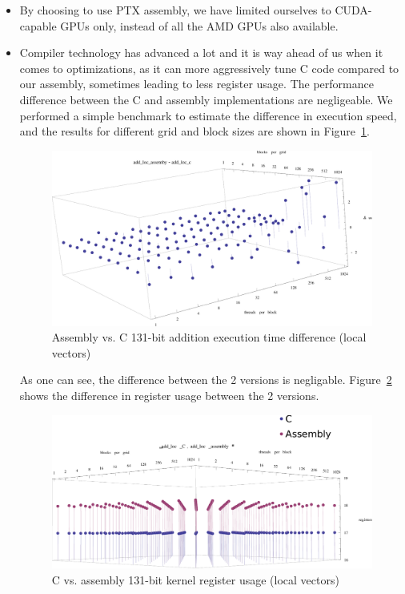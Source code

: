 \documentclass[12pt, a4paper]{report}
\begin{document}
\begin{sloppypar}
\begin{itemize}
\item By choosing to use PTX assembly, we have limited ourselves to CUDA-capable
GPUs only, instead of all the AMD GPUs also available.
\item Compiler technology has advanced a lot and it is way ahead of us when it
comes to optimizations, as it can more aggressively tune C code compared to
our assembly, sometimes leading to less register usage.
The performance difference between the C and assembly implementations are
negligeable.
We performed a simple benchmark to estimate the difference in execution speed,
and the results for different grid and block sizes are shown in
Figure~\ref{fig:assembly_vs_c_loc_kepler_131_duration_difference}.

\begin{figure}[h]
\centering
\includegraphics[scale=0.4]{figs/assembly_vs_c_loc_kepler_131_duration_difference}
\caption{Assembly vs. C 131-bit addition execution time difference (local vectors)}
\label{fig:assembly_vs_c_loc_kepler_131_duration_difference}
\end{figure}

As one can see, the difference between the 2 versions is negligable.
Figure~\ref{fig:assembly_vs_c_loc_kepler_131_registers} shows the difference in
register usage between the 2 versions.

\begin{figure}[h]
\centering
\includegraphics[scale=0.4]{figs/assembly_vs_c_loc_kepler_131_registers}
\caption{C vs. assembly 131-bit kernel register usage (local vectors)}
\label{fig:assembly_vs_c_loc_kepler_131_registers}
\end{figure}


\end{itemize}
\end{sloppypar}
\end{document}
